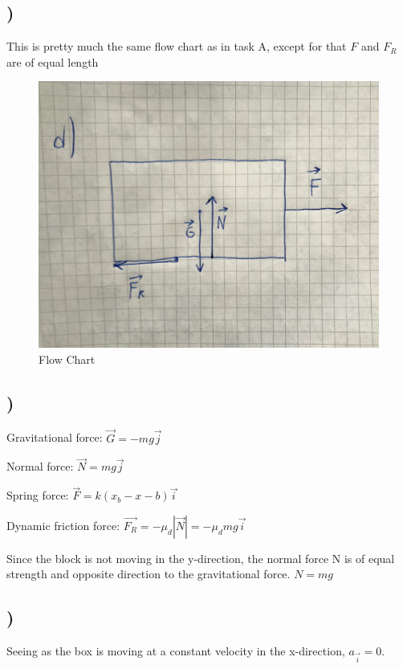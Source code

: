 \documentclass[a4paper,10pt,norsk]{article}
\begin{document}
\subsection{)}

This is pretty much the same flow chart as in task A, except for that $F$ and $F_{R}$ are of equal length

\begin{figure}[h!]
        \centering 
        \includegraphics[scale=0.4]{oppg_d.png} 
        \caption{Flow Chart}
\end{figure}

\subsection{)}
Gravitational force: $\vec{G} = -mg\vec{j}$

Normal force: $\vec{N} = mg\vec{j}$

Spring force: $\vec{F} = k(x_{b} - x - b)\vec{i}$

Dynamic friction force: $\vec{F_{R}} = -\mu_{d}|\vec{N}| = -\mu_{d} mg\vec{i}$

Since the block is not moving in the y-direction, the normal force N is of equal strength and opposite direction to the gravitational force. $N = mg$

\subsection{)}
Seeing as the box is moving at a constant velocity in the x-direction, $a_{\vec{i}} = 0$.
\end{document}
